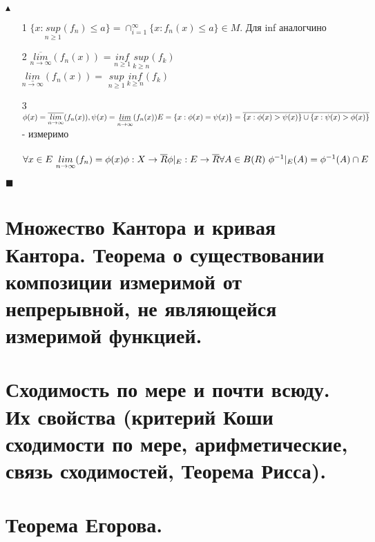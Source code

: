 $\blacktriangle$
\begin{itemize}
    \item [1]  $\{ x:\underset{n \geq 1}{sup}(f_n) \leq a\} = \cap_{i=1}^{\infty} \{x:f_n(x)\leq a\} \in M$. Для inf аналогчино 
     \item [2]$\overline{\underset{n\rightarrow\infty}{lim}}(f_n(x))$ = $\underset{n \geq 1}{inf}\ \underset{k \geq n}{sup}(f_k)$
     \\
     $\underset{n\rightarrow\infty}{\underline{lim}}(f_n(x)) = $ $\underset{n \geq 1}{sup}\ \underset{k \geq n}{inf}(f_k)$
     \item [3] $\phi(x) = \overline{\underset{n\rightarrow\infty}{lim}}(f_n(x)),  \\ 
     \psi(x) = \underset{n\rightarrow\infty}{\underline{lim}}(f_n(x)) 
    \\
    E = \{x: \phi(x) = \psi(x)\} = \overline{\{ x: \phi(x) > \psi(x)\} \cup \{x: \psi(x) > \phi(x)\}}$ - измеримо
    \\
    \\
    $\forall x \in E \ \underset{n \rightarrow \infty}{lim}(f_n) = \phi(x)\\ \\ \phi: X\rightarrow\overline{R} \\ \phi|_E :E\rightarrow\overline{R}
    \\
    \\
    \forall A \in B(R) \ \phi^{-1}|_E(A) = \phi^{-1}(A)\cap E$
\end{itemize}
$\blacksquare$
\newpage{}

\section{Множество Кантора и кривая Кантора. Теорема о существовании композиции измеримой от непрерывной, не являющейся измеримой функцией.}


\section{Сходимость по мере и почти всюду. Их свойства (критерий Коши сходимости по мере, арифметические, связь сходимостей, Теорема Рисса).}


\section{Теорема Егорова.}

\newpage{}

